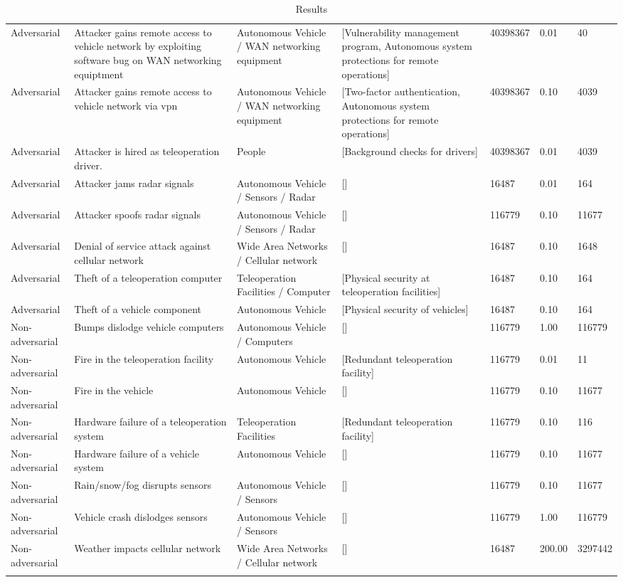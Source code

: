 \documentclass{article}
\begin{document}
\begin{landscape}
\begin{longtable}{l | p{5cm} | p{4.5cm} | p{4.5cm} | p{1.75cm} | p{1.5cm} | p{1cm}}
 Adversarial &  Attacker gains remote access to vehicle network by exploiting software bug on WAN networking equiptment &  Autonomous Vehicle / WAN networking equipment &  [Vulnerability management program, Autonomous system protections for remote operations] &  40398367 & 0.01 &  40 \\
 Adversarial &  Attacker gains remote access to vehicle network via vpn &  Autonomous Vehicle / WAN networking equipment &  [Two-factor authentication, Autonomous system protections for remote operations] &  40398367 & 0.10 &  4039 \\
 Adversarial &  Attacker is hired as teleoperation driver. &  People &  [Background checks for drivers] &  40398367 & 0.01 &  4039 \\
 Adversarial &  Attacker jams radar signals &  Autonomous Vehicle / Sensors / Radar &  [] &  16487 & 0.01 &  164 \\
 Adversarial &  Attacker spoofs radar signals &  Autonomous Vehicle / Sensors / Radar &  [] &  116779 & 0.10 &  11677 \\
 Adversarial &  Denial of service attack against cellular network &  Wide Area Networks / Cellular network &  [] &  16487 & 0.10 &  1648 \\
 Adversarial &  Theft of a teleoperation computer &  Teleoperation Facilities / Computer &  [Physical security at teleoperation facilities] &  16487 & 0.10 &  164 \\
 Adversarial &  Theft of a vehicle component &  Autonomous Vehicle &  [Physical security of vehicles] &  16487 & 0.10 &  164 \\
 Non-adversarial &  Bumps dislodge vehicle computers &  Autonomous Vehicle / Computers &  [] &  116779 & 1.00 &  116779 \\
 Non-adversarial &  Fire in the teleoperation facility &  Autonomous Vehicle &  [Redundant teleoperation facility] &  116779 & 0.01 &  11 \\
 Non-adversarial &  Fire in the vehicle &  Autonomous Vehicle &  [] &  116779 & 0.10 &  11677 \\
 Non-adversarial &  Hardware failure of a teleoperation system &  Teleoperation Facilities &  [Redundant teleoperation facility] &  116779 & 0.10 &  116 \\
 Non-adversarial &  Hardware failure of a vehicle system &  Autonomous Vehicle &  [] &  116779 & 0.10 &  11677 \\
 Non-adversarial &  Rain/snow/fog disrupts sensors &  Autonomous Vehicle / Sensors &  [] &  116779 & 0.10 &  11677 \\
 Non-adversarial &  Vehicle crash dislodges sensors &  Autonomous Vehicle / Sensors &  [] &  116779 & 1.00 &  116779 \\
 Non-adversarial &  Weather impacts cellular network &  Wide Area Networks / Cellular network &  [] &  16487 & 200.00 &  3297442 \\
     \caption{Results}
    \label{table:results}
    \end{longtable}
\end{landscape}
\end{document}
